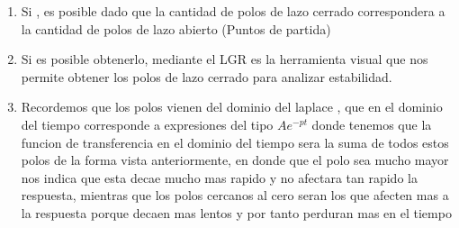 \documentclass[
  11pt,
  letterpaper,
   addpoints,
   answers
  ]{exam}
\begin{document}
\begin{questions}
\begin{solution}
\begin{enumerate}
    \item Si , es posible dado que la cantidad de polos de lazo cerrado correspondera a la cantidad de polos de lazo abierto (Puntos de partida)
    \item Si es posible obtenerlo, mediante el LGR es la herramienta visual que nos permite obtener los polos de lazo cerrado para analizar estabilidad.
    \item Recordemos que los polos vienen del dominio del laplace , que en el dominio del tiempo corresponde a expresiones del tipo $Ae^{-pt}$ donde tenemos que la funcion de transferencia en el dominio del tiempo sera la suma de todos estos polos de la forma vista anteriormente, en donde que el polo sea mucho mayor nos indica que esta decae mucho mas rapido y no afectara tan rapido la respuesta,  mientras que los polos cercanos al cero seran los que afecten mas a la respuesta porque decaen mas lentos y por tanto perduran mas en el tiempo
\end{enumerate}


\end{solution}


\end{questions}
\newpage
\end{document}
